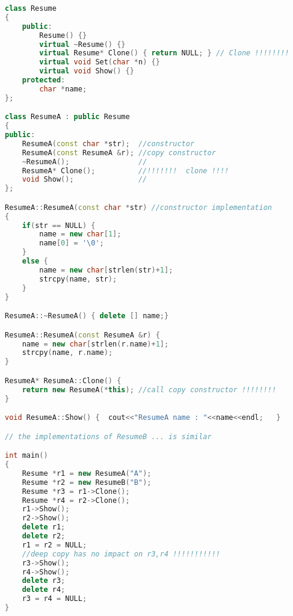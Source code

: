\documentclass{book}
\begin{document}
\begin{lstlisting}[caption={Prototype Pattern sample 0},language=C++]
class Resume  
{  
    public:  
        Resume() {}  
        virtual ~Resume() {}  
        virtual Resume* Clone() { return NULL; } // Clone !!!!!!!! 
        virtual void Set(char *n) {}  
        virtual void Show() {}  
    protected:  
        char *name;  
};  

class ResumeA : public Resume  
{  
public:  
    ResumeA(const char *str);  //constructor  
    ResumeA(const ResumeA &r); //copy constructor  
    ~ResumeA();                //  
    ResumeA* Clone();          //!!!!!!!  clone !!!!
    void Show();               //  
};  

ResumeA::ResumeA(const char *str) //constructor implementation   
{  
    if(str == NULL) {  
        name = new char[1];   
        name[0] = '\0';   
    }  
    else {  
        name = new char[strlen(str)+1];  
        strcpy(name, str);  
    }  
}  

ResumeA::~ResumeA() { delete [] name;}  

ResumeA::ResumeA(const ResumeA &r) {  
    name = new char[strlen(r.name)+1];  
    strcpy(name, r.name);  
}  

ResumeA* ResumeA::Clone() {  
    return new ResumeA(*this); //call copy constructor !!!!!!!! 
}  

void ResumeA::Show() {  cout<<"ResumeA name : "<<name<<endl;   }  

// the implementations of ResumeB ... is similar

int main()  
{  
    Resume *r1 = new ResumeA("A");  
    Resume *r2 = new ResumeB("B");  
    Resume *r3 = r1->Clone();  
    Resume *r4 = r2->Clone();  
    r1->Show();
    r2->Show();  
    delete r1;
    delete r2;     
    r1 = r2 = NULL;  
    //deep copy has no impact on r3,r4 !!!!!!!!!!! 
    r3->Show();
    r4->Show();  
    delete r3;
    delete r4;  
    r3 = r4 = NULL;  
}  
\end{lstlisting}
\end{document}
